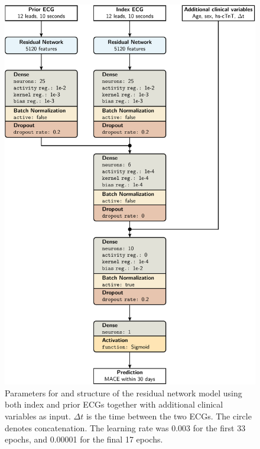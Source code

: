 \documentclass[preprint]{elsarticle}
\begin{document}
\begin{figure}[H]
\centering
\includegraphics[scale=\modelscale,keepaspectratio]{figures/model-rn4.pdf}
\caption{Parameters for and structure of the residual network model using both index and prior ECGs together with additional clinical variables as input. $\Delta t$ is the time between the two ECGs. The circle denotes concatenation. The learning rate was 0.003 for the first 33 epochs, and 0.00001 for the final 17 epochs.}
\end{figure}


\end{document}
